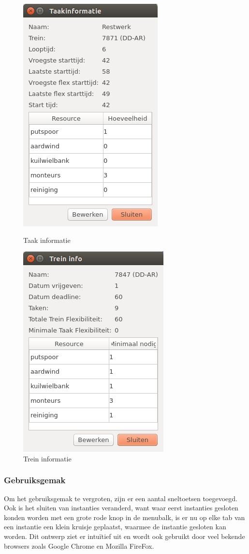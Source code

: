 \begin{figure}[H]
\parbox{.45\linewidth}{
    \center
    \includegraphics[width=.4\textwidth]{../images/taak-info.png}
    \caption{Taak informatie}
    \label{fig:taak-info}
}\hfill
\parbox{.45\linewidth}{
    \center
    \includegraphics[width=.4\textwidth]{../images/trein-info.png}%
    \caption{Trein informatie}
    \label{fig:trein-info}
}
\end{figure}

\subsubsection*{Gebruiksgemak}
Om het gebruiksgemak te vergroten, zijn er een aantal sneltoetsen toegevoegd. Ook is het sluiten van instanties veranderd, want waar eerst instanties gesloten konden worden met een grote rode knop in de menubalk, is er nu op elke tab van een instantie een klein kruisje geplaatst, waarmee de instantie gesloten kan worden. Dit ontwerp ziet er intu\"itief uit en wordt ook gebruikt door veel bekende browsers zoals Google Chrome en Mozilla FireFox.

